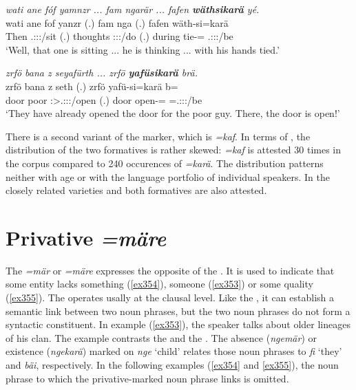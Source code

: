 \begin{exe}
	\ex \emph{wati ane fóf yamnzr ... fam ngarär ... fafen \textbf{wäthsikarä} yé.}\\
	\gll wati ane fof yanzr (.) fam nga (.) fafen wäth-si=karä \\
	Then {\Dem} {\Emph} \Tsg.\Masc:\Sbj:\Nonpast:\Ipfv/sit (.) thoughts \Stsg:\Sbj:\Nonpast:\Ipfv/do (.) during tie-\Nmlz={\Prop} \Tsg.\Masc:\Sbj:\Nonpast:\Ipfv/be\\
	\trans `Well, that one is sitting ... he is thinking ... with his hands tied.'\\
	\label{ex348}
\end{exe}
\begin{exe}
	\ex \emph{zrfö bana z seyafürth ... zrfö \textbf{yafüsikarä} brä.}\\
	\gll zrfö bana z seth (.) zrfö yafü-si=karä b=\\
	door poor {\Iam} \Stpl:\Sbj>\Tsg.\Masc:\Io:\Rpst:\Pfv/open (.) door open-\Nmlz={\Prop} \Med=\Tsg.\Masc:\Sbj:\Nonpast:\Ipfv/be\\
	\trans `They have already opened the door for the poor guy. There, the door is open!'\\
	\label{ex349}
\end{exe}
	
There is a second variant of the  marker, which is \emph{=kaf}. In terms of , the distribution of the two formatives is rather skewed: \emph{=kaf} is attested 30 times in the corpus compared to 240 occurences of \emph{=karä}. The distribution patterns neither with age or with the language portfolio of individual speakers. In the closely related varieties  and  both formatives are also attested.

\section{Privative \emph{=märe}} \label{privcase}

The   \emph{=mär} or \emph{=märe} expresses the opposite of the . It is used to indicate that some entity lacks something (\ref{ex354}), someone (\ref{ex353}) or some quality (\ref{ex355}). The  operates usally at the clausal level. Like the  , it can establish a semantic link between two noun phrases, but the two noun phrases do not form a syntactic constituent. In example (\ref{ex353}), the speaker talks about older lineages of his clan. The example contrasts the  and the  . The absence (\emph{ngemär}) or existence (\emph{ngekarä}) marked on \emph{nge} `child' relates those noun phrases to \emph{fi} `they' and \emph{bäi}, respectively. In the following examples (\ref{ex354} and \ref{ex355}), the noun phrase to which the privative-marked noun phrase links is omitted.

